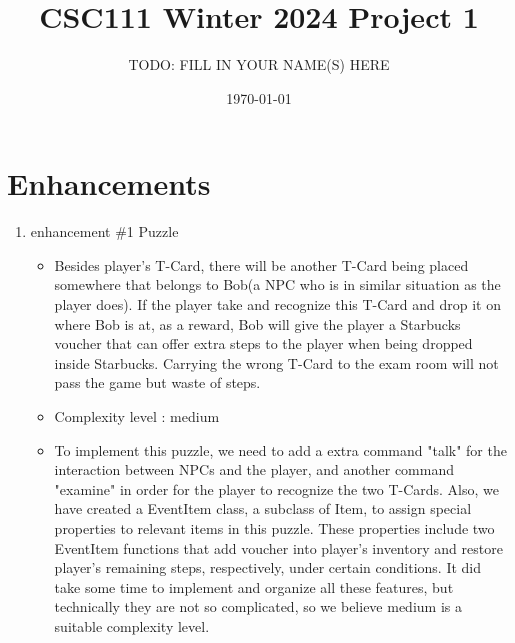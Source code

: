 \documentclass[11pt]{article}
\title{CSC111 Winter 2024 Project 1}
\author{TODO: FILL IN YOUR NAME(S) HERE}
\date{\today}
\begin{document}
\maketitle

\section*{Enhancements}


\begin{enumerate}

\item enhancement \#1 Puzzle
	\begin{itemize}
	\item Besides player's T-Card, there will be another T-Card being placed somewhere that belongs to Bob(a NPC who is in similar situation as the player does). If the player take and recognize this T-Card and drop it on where Bob is at, as a reward, Bob will give the player a Starbucks voucher that can offer extra steps to the player when being dropped inside Starbucks. Carrying the wrong T-Card to the exam room will not pass the game but waste of steps.
	\item Complexity level : medium
	\item To implement this puzzle, we need to add a extra command "talk" for the interaction between NPCs and the player, and another command "examine" in order for the player to recognize the two T-Cards. Also, we have created a EventItem class, a subclass of Item, to assign special properties to relevant items in this puzzle. These properties include two EventItem functions that add voucher into player's inventory and restore player's remaining steps, respectively, under certain conditions. It did take some time to implement and organize all these features, but technically they are not so complicated, so we believe medium is a suitable complexity level.
	\end{itemize}


\end{enumerate}
\end{document}
